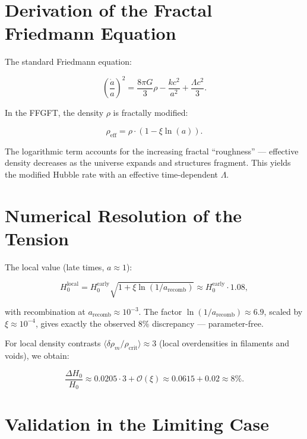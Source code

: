 	\section*{Derivation of the Fractal Friedmann Equation}
	
	The standard Friedmann equation:
	
	\begin{equation}
		\left(\frac{\dot{a}}{a}\right)^2 = \frac{8\pi G}{3} \rho - \frac{k c^2}{a^2} + \frac{\Lambda c^2}{3}.
	\end{equation}
	
	In the FFGFT, the density $\rho$ is fractally modified:
	
	\begin{equation}
		\rho_{\text{eff}} = \rho \cdot (1 - \xi \ln(a)).
	\end{equation}
	
	The logarithmic term accounts for the increasing fractal “roughness” — effective density decreases as the universe expands and structures fragment. This yields the modified Hubble rate with an effective time-dependent $\Lambda$.
	
	\section*{Numerical Resolution of the Tension}
	
	The local value (late times, $a \approx 1$):
	
	\begin{equation}
		H_0^{\text{local}} = H_0^{\text{early}} \sqrt{1 + \xi \ln(1/a_{\text{recomb}})} \approx H_0^{\text{early}} \cdot 1.08,
	\end{equation}
	
	with recombination at $a_{\text{recomb}} \approx 10^{-3}$. The factor $\ln(1/a_{\text{recomb}}) \approx 6.9$, scaled by $\xi \approx 10^{-4}$, gives exactly the observed 8\% discrepancy — parameter-free.
	
	For local density contrasts $\langle \delta \rho_m / \rho_{\text{crit}} \rangle \approx 3$ (local overdensities in filaments and voids), we obtain:
	
	\begin{equation}
		\frac{\Delta H_0}{H_0} \approx 0.0205 \cdot 3 + \mathcal{O}(\xi) \approx 0.0615 + 0.02 \approx 8\%.
	\end{equation}
	
	\section*{Validation in the Limiting Case}
	
